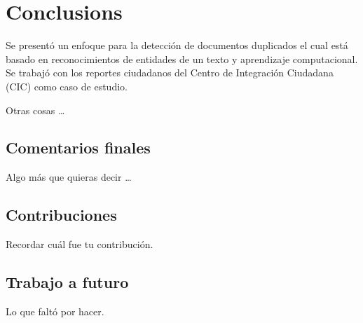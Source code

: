 \chapter{Conclusions}
\label{conclusions}

Se present\'{o} un enfoque para la detecci\'{o}n de documentos duplicados el cual est\'{a} basado en reconocimientos de entidades de un texto y aprendizaje computacional. Se trabaj\'{o} con los reportes ciudadanos del Centro de Integraci\'{o}n Ciudadana (CIC) como caso de estudio.

Otras cosas \ldots

\section{Comentarios finales}

Algo m\'{a}s que quieras decir \ldots

\section{Contribuciones}

Recordar cu\'{a}l fue tu contribuci\'{o}n.

\section{Trabajo a futuro}

Lo que falt\'{o} por hacer.

\clearpage
